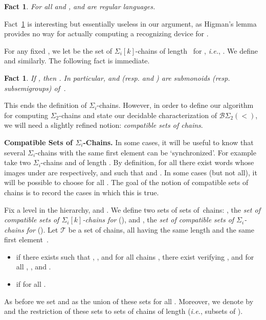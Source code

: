 \documentclass[envcountsame]{llncs}
\newcommand\Ts{\ensuremath{\mathcal{T}}\xspace}
\newcommand{\sic}[1]{\ensuremath{\Sigma_{#1}}\xspace}
\newcommand{\bswd}{\ensuremath{\mathcal{B}\Sigma_{2}(<)}\xspace}
\newcommand\chains{chains\xspace}
\newcommand\qchains[1]{\ensuremath{\sic{#1}}-chains\xspace}
\newcommand\qChains[1]{\ensuremath{\sic{#1}}-Chains\xspace}
\newcommand\qpchains[2]{\ensuremath{\sic{#1}[#2]}-chains\xspace}
\newcommand\ichains{\qchains{i}}
\newcommand\dchains{\qchains{2}}
\newcommand\iChains{\qChains{i}}
\newcommand\ikchains{\qpchains{i}{k}}
\newtheorem{fact}[theorem]{Fact}
\begin{document}
\begin{fact} \label{fct:high}
  For all  and ,  and
   are regular languages.
\end{fact}

Fact~\ref{fct:high} is interesting but essentially useless in our
argument, as Higman's lemma provides no way for actually computing a
recognizing device for .

For any fixed , we let   be the
set of \ikchains of length~ for ,
\emph{i.e.}, . We define
 and  similarly. The
following fact is immediate.

\begin{fact} \label{fct:chaincomp} If , then
  .  In
  particular,  and  (resp. 
  and ) are submonoids (resp. subsemigroups) of~.
\end{fact}





This ends the definition of \ichains. However, in order to define our
algorithm for computing \dchains and state our decidable
characterization of \bswd, we will need a slightly refined notion:
\emph{compatible sets of \chains}.

\medskip
\noindent
{\bf Compatible Sets of \iChains.} In some cases, it will be useful to
know that several \ichains with the same first element can be
`synchronized'. For example take two \ichains  and 
of length . By definition, for all  there exist words
 whose images under  are  respectively, and such that  and . In some cases (but not all),
it will be possible to choose  for all . The goal of the
notion of compatible sets of \chains is to record the cases in which
this is true.

Fix  a level in the hierarchy,  and .
We define two sets of sets of~\chains:
, the \emph{set of compatible sets of \ikchains for}
(), and
, the \emph{set of compatible sets of
  \ichains for} ().
Let \Ts be a set of \chains, all having the same
length  and the same
first element~.
\begin{itemize}
  \itemsep1ex
\item  if there exists  such
  that , , and for all \chains
  , there exist 
  verifying , and for all ,
  , and .
\item  if   for all . 
\end{itemize}

As before we set  and  as the union
of these sets for all . Moreover, we denote by
 and
 the restriction of these sets to sets of \chains of
length  (\emph{i.e.}, subsets of ).
\end{document}
